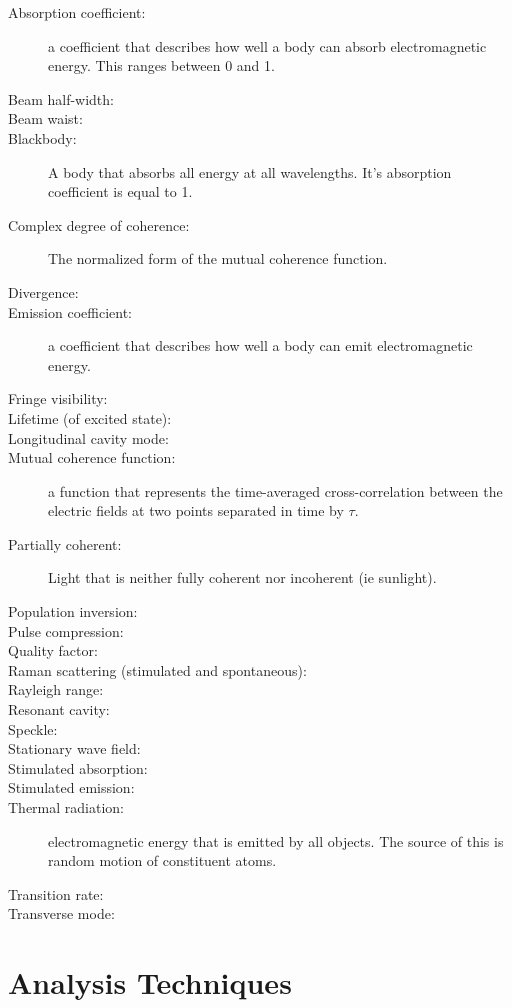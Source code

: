 \documentclass[12pt]{report}
\begin{document}
\begin{description}
\item[Absorption coefficient: ] a coefficient that describes how well a body can absorb electromagnetic energy. This ranges between 0 and 1. 
\item[Beam half-width: ]
\item[Beam waist: ]
\item[Blackbody: ] A body that absorbs all energy at all wavelengths. It's absorption coefficient is equal to 1. 
\item[Complex degree of coherence: ] The normalized form of the mutual coherence function. 
\item[Divergence: ]
\item[Emission coefficient: ] a coefficient that describes how well a body can emit electromagnetic energy. 
\item[Fringe visibility: ]
\item[Lifetime (of excited state): ]
\item[Longitudinal cavity mode: ]
\item[Mutual coherence function: ] a function that represents the time-averaged cross-correlation between the electric fields at two points separated in time by $\tau$. 
\item[Partially coherent: ] Light that is neither fully coherent nor incoherent (ie sunlight). 
\item[Population inversion: ]
\item[Pulse compression: ]
\item[Quality factor: ]
\item[Raman scattering (stimulated and spontaneous): ]
\item[Rayleigh range: ]
\item[Resonant cavity: ]
\item[Speckle: ]
\item[Stationary wave field: ]
\item[Stimulated absorption: ]
\item[Stimulated emission: ]
\item[Thermal radiation: ] electromagnetic energy that is emitted by all objects. The source of this is random motion of constituent atoms. 
\item[Transition rate: ]
\item[Transverse mode: ]
\end{description}

\part{Analysis Techniques}
\end{document}
